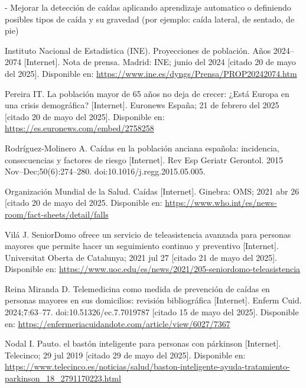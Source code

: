 \documentclass[12pt, a4paper]{article}
\begin{document}
	- Mejorar la detección de caídas aplicando aprendizaje automatico o definiendo posibles tipos de caída y su gravedad (por ejemplo: caída lateral, de sentado, de pie)  


\begin{thebibliography}{9}
	
	
	Instituto Nacional de Estadística (INE). Proyecciones de población. Años 2024–2074 [Internet]. Nota de prensa. Madrid: INE; junio del 2024  [citado 20 de mayo del 2025]. Disponible en: \url{https://www.ine.es/dyngs/Prensa/PROP20242074.htm}
	
	Pereira IT. La población mayor de 65 años no deja de crecer: ¿Está Europa en una crisis demográfica? [Internet]. Euronews España; 21 de febrero del 2025 [citado 20 de mayo del 2025]. Disponible en: \url{https://es.euronews.com/embed/2758258}
	
	Rodríguez-Molinero A.  
	Caídas en la población anciana española: incidencia, consecuencias y factores de riesgo [Internet].  
	Rev Esp Geriatr Gerontol. 2015 Nov–Dec;50(6):274–280.  
	doi:10.1016/j.regg.2015.05.005.

	Organización Mundial de la Salud. Caídas [Internet]. Ginebra: OMS; 2021 abr 26 [citado 20 de mayo del 2025. Disponible en: \url{https://www.who.int/es/news-room/fact-sheets/detail/falls}
		
	Vilá J. SeniorDomo ofrece un servicio de teleasistencia avanzada para personas mayores que permite hacer un seguimiento continuo y preventivo [Internet]. Universitat Oberta de Catalunya; 2021 jul 27 [citado 21 de mayo del 2025]. Disponible en: \url{https://www.uoc.edu/es/news/2021/205-seniordomo-teleasistencia}

	
	Reina Miranda D. Telemedicina como medida de prevención de caídas en personas mayores en sus domicilios: revisión bibliográfica [Internet]. Enferm Cuid. 2024;7:63–77. doi:10.51326/ec.7.7019787 [citado 15 de mayo del 2025]. Disponible en: \url{https://enfermeriacuidandote.com/article/view/6027/7367}
	
	
	Nodal I. Pauto. el bastón inteligente para personas con párkinson [Internet]. Telecinco; 29 jul 2019 [citado 29 de mayo del 2025]. Disponible en: \url{https://www.telecinco.es/noticias/salud/baston-inteligente-ayuda-tratamiento-parkinson_18_2791170223.html}
	

\end{thebibliography}
\end{document}

